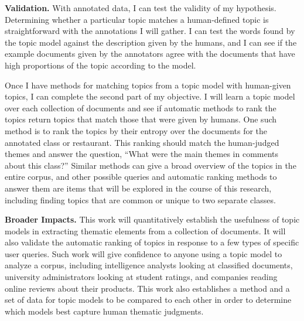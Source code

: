 \documentclass[onecolumn, 12pt]{article}
\begin{document}
\textbf{Validation.}  With annotated data, I can test the validity of my
hypothesis.  Determining whether a particular topic matches a human-defined
topic is straightforward with the annotations I will gather.  I can test the
words found by the topic model against the description given by the humans, and
I can see if the example documents given by the annotators agree with the
documents that have high proportions of the topic according to the model.

Once I have methods for matching topics from a topic model with human-given
topics, I can complete the second part of my objective.  I will learn a topic
model over each collection of documents and see if automatic methods to rank
the topics return topics that match those that were given by humans.  One such
method is to rank the topics by their entropy over the documents for the
annotated class or restaurant.  This ranking should match the human-judged
themes and answer the question, ``What were the main themes in comments about
this class?'' Similar methods can give a broad overview of the topics in the
entire corpus, and other possible queries and automatic ranking methods to
answer them are items that will be explored in the course of this research,
including finding topics that are common or unique to two separate classes.

\textbf{Broader Impacts.}  This work will quantitatively establish the
usefulness of topic models in extracting thematic elements from a collection of
documents.  It will also validate the automatic ranking of topics in response
to a few types of specific user queries.  Such work will give confidence to
anyone using a topic model to analyze a corpus, including intelligence analysts
looking at classified documents, university administrators looking at student
ratings, and companies reading online reviews about their products.  This work
also establishes a method and a set of data for topic models to be compared to
each other in order to determine which models best capture human thematic
judgments.

\footnotesize

\renewcommand\bibsection{\noindent \small\textbf{References}\vspace{-2mm}\footnotesize}

\end{document}
